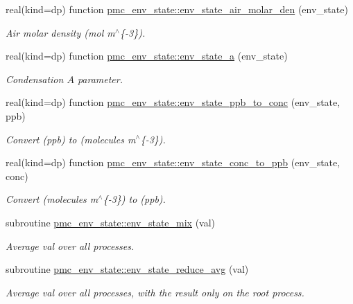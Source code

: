 \begin{DoxyCompactItemize}
real(kind=dp) function \mbox{\hyperlink{namespacepmc__env__state_a71d24aa32a9f0f3cbb919654fc588039}{pmc\+\_\+env\+\_\+state\+::env\+\_\+state\+\_\+air\+\_\+molar\+\_\+den}} (env\+\_\+state)
\begin{DoxyCompactList}\small\item\em Air molar density (mol m$^\wedge$\{-\/3\}). \end{DoxyCompactList}\item 
real(kind=dp) function \mbox{\hyperlink{namespacepmc__env__state_a400b3cc0c7eeee1a0b88f59ea59a8568}{pmc\+\_\+env\+\_\+state\+::env\+\_\+state\+\_\+a}} (env\+\_\+state)
\begin{DoxyCompactList}\small\item\em Condensation $A$ parameter. \end{DoxyCompactList}\item 
real(kind=dp) function \mbox{\hyperlink{namespacepmc__env__state_a8069f202b6375dd2a08448f818673673}{pmc\+\_\+env\+\_\+state\+::env\+\_\+state\+\_\+ppb\+\_\+to\+\_\+conc}} (env\+\_\+state, ppb)
\begin{DoxyCompactList}\small\item\em Convert (ppb) to (molecules m$^\wedge$\{-\/3\}). \end{DoxyCompactList}\item 
real(kind=dp) function \mbox{\hyperlink{namespacepmc__env__state_ad49196e422e5bc68ec531a4804eef4f2}{pmc\+\_\+env\+\_\+state\+::env\+\_\+state\+\_\+conc\+\_\+to\+\_\+ppb}} (env\+\_\+state, conc)
\begin{DoxyCompactList}\small\item\em Convert (molecules m$^\wedge$\{-\/3\}) to (ppb). \end{DoxyCompactList}\item 
subroutine \mbox{\hyperlink{namespacepmc__env__state_afd588fc925707d56dbe301556e82dfc8}{pmc\+\_\+env\+\_\+state\+::env\+\_\+state\+\_\+mix}} (val)
\begin{DoxyCompactList}\small\item\em Average val over all processes. \end{DoxyCompactList}\item 
subroutine \mbox{\hyperlink{namespacepmc__env__state_aa3ca5b0885819b41abc09c607ee28e7f}{pmc\+\_\+env\+\_\+state\+::env\+\_\+state\+\_\+reduce\+\_\+avg}} (val)
\begin{DoxyCompactList}\small\item\em Average val over all processes, with the result only on the root process. \end{DoxyCompactList}\item 

\end{DoxyCompactItemize}
